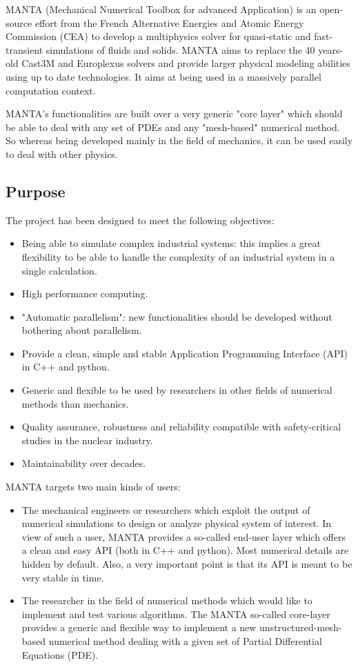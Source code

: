 MANTA (Mechanical Numerical Toolbox for advanced Application) is an open-source
effort from the French Alternative Energies and Atomic Energy Commission (CEA) to develop a
multiphysics solver for quasi-static and fast-transient simulations of fluids and solids. MANTA aims
to replace the 40 years-old Cast3M and Europlexus solvers and provide larger physical modeling
abilities using up to date technologies. It aims at being used in a massively parallel computation context.

MANTA's functionalities are built over a very generic "core layer" which should be able to deal
with any set of PDEs and any "mesh-based" numerical method. So whereas being developed mainly in the
field of mechanics, it can be used easily to deal with other physics.

\subsection{Purpose}
\label{sec:MANTA:purpose}

The project has been designed to meet the following objectives:
\begin{itemize}
    \item Being able to simulate complex industrial systems: this implies a great flexibility to be able to handle the complexity of an industrial system in a single calculation.
    \item High performance computing.
    \item "Automatic parallelism": new functionalities should be developed without bothering about parallelism.
    \item Provide a clean, simple and stable Application Programming Interface (API) in C++ and python.
    \item Generic and flexible to be used by researchers in other fields of numerical methods than mechanics.
    \item Quality assurance, robustness and reliability compatible with safety-critical studies in the
nuclear industry.
    \item Maintainability over decades.
\end{itemize}

MANTA targets two main kinds of users:
\begin{itemize}
    \item The mechanical engineers or researchers which exploit the output of numerical simulations
to design or analyze physical system of interest. In view of such a user, MANTA provides
a so-called end-user layer which offers a clean and easy API (both in C++ and python).
Most numerical details are hidden by default. Also, a very important point is that its API
is meant to be very stable in time.
    \item The researcher in the field of numerical methods which would like to implement and test
various algorithms. The MANTA so-called core-layer provides a generic and flexible way to
implement a new unstructured-mesh-based numerical method dealing with a given set of
Partial Differential Equations (PDE).
\end{itemize}

